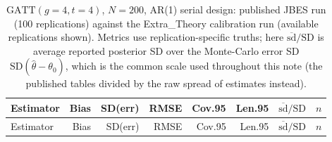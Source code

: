 {\footnotesize
\begin{longtable}{lrrrrrrr}
\caption{$\mathrm{GATT}(g{=}4,t{=}4)$, $N=200$, AR(1) serial design: published JBES run (100 replications) against the Extra\_Theory calibration run (available replications shown). Metrics use replication-specific truths; here $\overline{\mathrm{sd}}/\mathrm{SD}$ is average reported posterior SD over the Monte-Carlo error SD $\mathrm{SD}(\widehat\theta-\theta_0)$, which is the common scale used throughout this note (the published tables divided by the raw spread of estimates instead).}\label{tab:repro_serial}\\
\toprule
Estimator & Bias & SD(err) & RMSE & Cov.95 & Len.95 & $\overline{\mathrm{sd}}/\mathrm{SD}$ & $n$ \\
\midrule

\endfirsthead
\toprule
Estimator & Bias & SD(err) & RMSE & Cov.95 & Len.95 & $\overline{\mathrm{sd}}/\mathrm{SD}$ & $n$ \\
\midrule


\end{longtable}}
